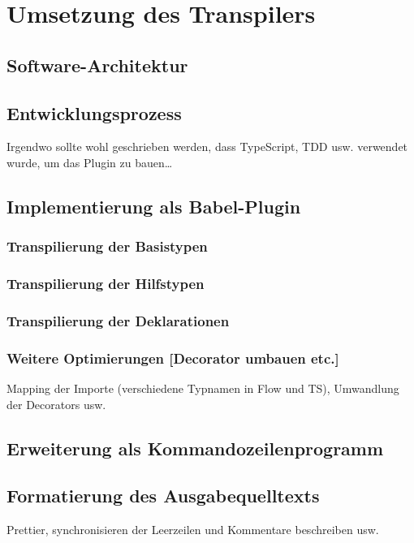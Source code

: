 \chapter{Umsetzung des Transpilers}

\section{Software-Architektur}

\section{Entwicklungsprozess}
  Irgendwo sollte wohl geschrieben werden, dass TypeScript, TDD usw. verwendet wurde, um das Plugin zu bauen\dots

\section{Implementierung als Babel-Plugin}
  \subsection{Transpilierung der Basistypen}
  \subsection{Transpilierung der Hilfstypen}
  \subsection{Transpilierung der Deklarationen}
  \subsection{Weitere Optimierungen [Decorator umbauen etc.]}

  Mapping der Importe (verschiedene Typnamen in Flow und TS), Umwandlung der Decorators usw.

\section{Erweiterung als Kommandozeilenprogramm}
\section{Formatierung des Ausgabequelltexts}

  Prettier, synchronisieren der Leerzeilen und Kommentare beschreiben usw.
